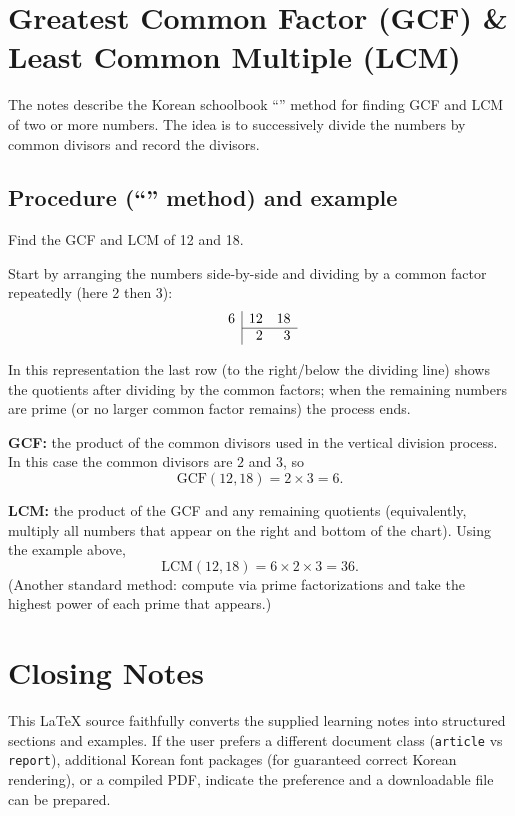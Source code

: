 \documentclass[12pt]{article}
\begin{document}
\section{Greatest Common Factor (GCF) \& Least Common Multiple (LCM)}
The notes describe the Korean schoolbook ``\texttt{}'' method for 
finding GCF and LCM of two or more numbers. The idea is to successively 
divide the numbers by common divisors and record the divisors.

\subsection{Procedure (``\texttt{}'' method) and example}
Find the GCF and LCM of 12 and 18.

Start by arranging the numbers side-by-side and dividing by a common factor repeatedly (here 2 then 3):
\[\begin{array}{r|rr}
   6 & 12 & 18 \\
   \cline{2-3}
     & 2 & 3 \\
\end{array}\]

In this representation the last row (to the right/below the dividing line) shows the quotients 
after dividing by the common factors; when the remaining numbers are prime (or no larger 
common factor remains) the process ends.

\textbf{GCF:} the product of the common divisors used in the vertical division process. In this case the common divisors are $2$ and $3$, so
\[\mathrm{GCF}(12,18)=2\times 3=6.\]

\textbf{LCM:} the product of the GCF and any remaining quotients (equivalently, 
multiply all numbers that appear on the right and bottom of the \texttt{} 
chart). Using the example above,
\[\mathrm{LCM}(12,18)=6\times 2\times 3=36.\]
(Another standard method: compute via prime factorizations and take the highest power of each prime that appears.)

\section*{Closing Notes}
This LaTeX source faithfully converts the supplied learning notes into structured sections and examples. If the user prefers a different document class (\texttt{article} vs \texttt{report}), additional Korean font packages (for guaranteed correct Korean rendering), or a compiled PDF, indicate the preference and a downloadable file can be prepared.
\end{document}

